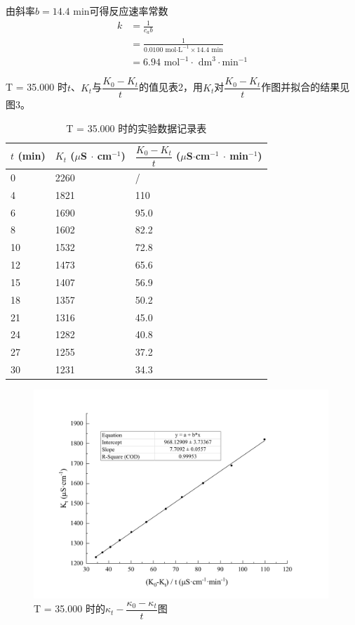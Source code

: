 \documentclass[a4paper]{ctexart}
\begin{document}
		\clearpage
		由斜率$b=14.4$ min可得反应速率常数
		\begin{align*}
			k&=\frac{1}{c_ab} \\
			&=\frac{1}{0.0100\text{ mol·L}^{-1}\times14.4\text{ min}} \\
			&=6.94\text{ mol}^{-1}\cdot \text{ dm}^3\cdot \text{min}^{-1}
		\end{align*}

		T = 35.000 \textcelsius 时$t$、$K_t$与$\dfrac{K_0-K_t}{t}$的值见表2，用$K_t$对$\dfrac{K_0-K_t}{t}$作图并拟合的结果见图3。\par
		\begin{table}[htb]
			\caption{T = 35.000 \textcelsius 时的实验数据记录表}
			\begin{center}
				\begin{tabular}{p{6em}p{12em}p{16em}}
				\toprule
				$t$ (min) & $K_t$ ($\mu$S $\cdot$ cm$^{-1}$)
				& $\dfrac{K_0-K_t}{t}$ ($\mu$S$\cdot$cm$^{-1}$ $\cdot$ min$^{-1}$) \\
				\midrule
				0 &  2260 & / \\
				4 & 1821 & 110 \\
				6 & 1690 & 95.0\\
				8 & 1602 & 82.2 \\
				10 & 1532 & 72.8 \\
				12 & 1473 & 65.6 \\
				15 & 1407 & 56.9 \\
				18 & 1357 & 50.2 \\
				21 & 1316 & 45.0 \\
				24 & 1282 & 40.8 \\
				27 & 1255 & 37.2 \\
				30 & 1231 & 34.3 \\
				\bottomrule
				\end{tabular}
			\end{center}
			\label{default}
		\end{table}
		\begin{figure}[htb]
			\begin{center}
			\includegraphics[width=30em]{T=35.pdf}
			\caption{T = 35.000 \textcelsius 时的$\kappa_t-\dfrac{\kappa_0-\kappa_t}{t}$图}
			\label{}
			\end{center}
		\end{figure}
\end{document}
